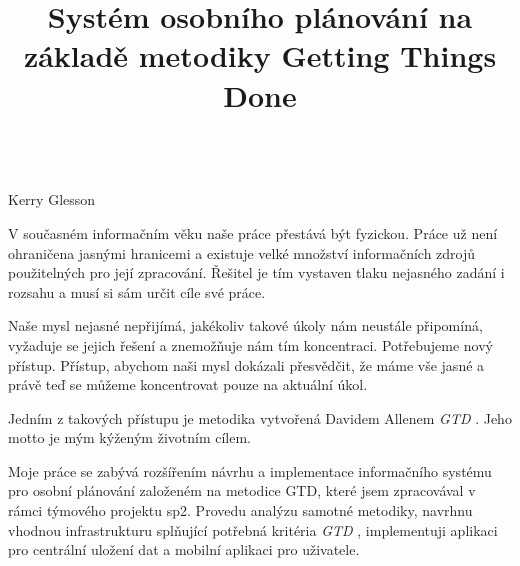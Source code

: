 \documentclass[thesis=B,czech]{FITthesis}[2012/06/26]
\title{Systém osobního plánování na základě metodiky Getting Things Done}
\newcommand{\GTD}{\textit{GTD }}
\begin{document}
 


\todototoc
\listoftodos

\begin{introduction}
\begin{center}
\textit{}\\
Kerry Glesson
\end{center}

V současném informačním věku naše práce přestává být fyzickou. Práce už není ohraničena jasnými hranicemi a existuje velké množství informačních zdrojů použitelných pro její zpracování. Řešitel je tím vystaven tlaku nejasného zadání i rozsahu a musí si sám určit cíle své práce.

Naše mysl nejasné nepřijímá, jakékoliv takové úkoly nám neustále připomíná, vyžaduje se jejich řešení a znemožňuje nám tím koncentraci. Potřebujeme nový přístup. Přístup, abychom naši mysl dokázali přesvědčit, že máme vše jasné a právě teď se můžeme koncentrovat pouze na aktuální úkol.

Jedním z takových přístupu je metodika vytvořená Davidem Allenem \GTD\cite{gtd}. Jeho motto \textit{} je mým kýženým životním cílem.

Moje práce se zabývá rozšířením návrhu a implementace informačního systému pro osobní plánování založeném na metodice GTD, které jsem zpracovával v rámci týmového projektu \acrshort{sp2}. Provedu analýzu samotné metodiky, navrhnu vhodnou infrastrukturu splňující potřebná kritéria \GTD\cite{gtd}, implementuji aplikaci pro centrální uložení dat a mobilní aplikaci pro uživatele.    

	
\end{introduction}
\end{document}
